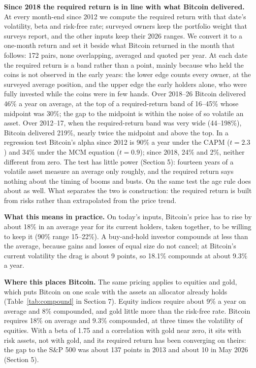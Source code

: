 \documentclass[11pt]{article}
\begin{document}
\textbf{Since 2018 the required return is in line with what Bitcoin delivered.} At every month-end since 2012 we compute the required return with that date's volatility, beta and risk-free rate; surveyed owners keep the portfolio weight that surveys report, and the other inputs keep their 2026 ranges. We convert it to a one-month return and set it beside what Bitcoin returned in the month that follows: 172 pairs, none overlapping, averaged and quoted per year. At each date the required return is a band rather than a point, mainly because who held the coins is not observed in the early years: the lower edge counts every owner, at the surveyed average position, and the upper edge the early holders alone, who were fully invested while the coins were in few hands. Over 2018--26 Bitcoin delivered 46\% a year on average, at the top of a required-return band of 16--45\% whose midpoint was 30\%; the gap to the midpoint is within the noise of so volatile an asset. Over 2012--17, when the required-return band was very wide (44--198\%), Bitcoin delivered 219\%, nearly twice the midpoint and above the top. In a regression test Bitcoin's alpha since 2012 is 90\% a year under the CAPM ($t = 2.3$) and 34\% under the MCM equation ($t = 0.9$); since 2018, 24\% and 2\%, neither different from zero. The test has little power (Section 5): fourteen years of a volatile asset measure an average only roughly, and the required return says nothing about the timing of booms and busts. On the same test the age rule does about as well. What separates the two is construction: the required return is built from risks rather than extrapolated from the price trend.

\textbf{What this means in practice.} On today's inputs, Bitcoin's price has to rise by about 18\% in an average year for its current holders, taken together, to be willing to keep it (90\% range 15--22\%). A buy-and-hold investor compounds at less than the average, because gains and losses of equal size do not cancel; at Bitcoin's current volatility the drag is about 9 points, so 18.1\% compounds at about 9.3\% a year.

\textbf{Where this places Bitcoin.} The same pricing applies to equities and gold, which puts Bitcoin on one scale with the assets an allocator already holds (Table~\ref{tab:compound} in Section 7). Equity indices require about 9\% a year on average and 8\% compounded, and gold little more than the risk-free rate. Bitcoin requires 18\% on average and 9.3\% compounded, at three times the volatility of equities. With a beta of 1.75 and a correlation with gold near zero, it sits with risk assets, not with gold, and its required return has been converging on theirs: the gap to the S\&P 500 was about 137 points in 2013 and about 10 in May 2026 (Section 5).
\end{document}
